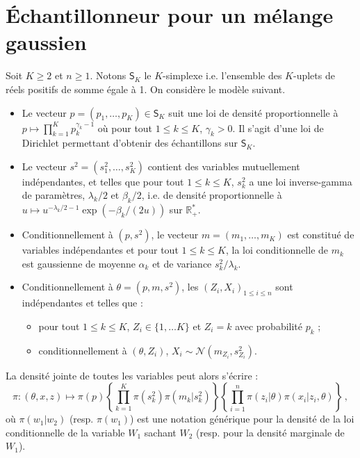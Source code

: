 \documentclass[a4paper,10pt,fleqn]{article}
\newcommand{\1}{\ensuremath{\mathbbm{1}}}
\begin{document}
\section*{\'Echantillonneur pour un m\'elange gaussien}
Soit $K\geq 2$ et $n\geq 1$. Notons $\mathsf{S}_K$ le $K$-simplexe i.e. l'ensemble des $K$-uplets de r\'eels positifs de somme \'egale \`a 1.  On consid\`ere le mod\`ele suivant.%
\begin{itemize}
\item Le vecteur $p = (p_1,\ldots,p_K)\in\mathsf{S}_K$ suit une loi de densit\'e proportionnelle \`a  $p \mapsto \prod_{k=1}^Kp_k^{\gamma_k-1}$ o\`u pour tout $1\leq k \leq K$, $\gamma_k>0$. Il s'agit d'une loi de Dirichlet permettant d'obtenir des \'echantillons sur $\mathsf{S}_K$.%
\item Le vecteur $s^2 =(s^2_{1},\ldots,s^2_K)$ contient des variables mutuellement ind\'ependantes, et telles que pour tout $1\leq k \leq K$, $s^2_k$ a une loi inverse-gamma de param\`etres, $\lambda_k/2$ et $\beta_k/2$, i.e. de densit\'e proportionnelle \`a $u\mapsto u^{-\lambda_k/2-1}\exp(-\beta_k/(2u))$ sur $\mathbb{R}_+^*$.
\item Conditionnellement \`a $(p,s^2)$, le vecteur $m=(m_1,\ldots,m_K)$ est constitu\'e de variables ind\'ependantes et pour tout $1\leq k \leq K$, la loi conditionnelle de $m_k$ est gaussienne de moyenne $\alpha_k$ et de variance $s_k^2/\lambda_k$.
\item Conditionnellement \`a $\theta = (p, m, s^2)$, les $(Z_i,X_i)_{1\leq i \leq n}$ sont ind\'ependantes et telles que :
\begin{itemize}
\item pour tout $1\leq k \leq K$, $Z_i\in\{1,\ldots K\}$ et $Z_i = k $ avec probabilit\'e $p_k$ ;
\item conditionnellement \`a $(\theta,Z_i)$, $X_i \sim\mathcal{N}(m_{Z_i},s^2_{Z_i})$.
\end{itemize}
\end{itemize}
La densit\'e jointe de toutes les variables peut alors s'\'ecrire :
$$
\pi: (\theta,x,z) \mapsto \pi(p) \left\{\prod_{k=1}^K\pi(s_k^2)\pi(m_k|s_k^2)\right\}\left\{\prod_{i=1}^n\pi(z_i|\theta)\pi(x_i|z_i,\theta)\right\}\,,
$$
o\`u $\pi(w_1|w_2)$ (resp. $\pi(w_1)$) est une notation g\'en\'erique pour la densit\'e de la loi conditionnelle de la variable $W_1$ sachant $W_2$ (resp. pour la densit\'e marginale de $W_1$).
\end{document}
